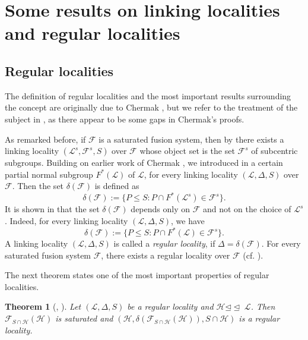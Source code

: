 \documentclass[reqno,11pt]{amsart}
\numberwithin{equation}{section}
\newtheorem{theorem}{Theorem}[section]
\theoremstyle{definition}
\newcommand{\F}{\mathcal{F}}
\renewcommand{\L}{\mathcal{L}}
\renewcommand{\H}{\mathcal{H}}
\newcommand{\subn}{{\unlhd\!\unlhd\;}}
\begin{document}
\section{Some results on linking localities and regular localities}


\subsection{Regular localities}\label{SS:Regular}

The definition of regular localities and the most important results surrounding the concept are originally due to Chermak \cite{ChermakIII}, but we refer to the treatment of the subject in \cite{Henke:Regular}, as there appear to be some gaps in Chermak's proofs.

\smallskip

As remarked before, if $\F$ is a saturated fusion system, then by \cite[Theorem~A]{Henke:2015} there exists a linking locality $(\L^s,\F^s,S)$ over $\F$ whose object set is the set $\F^s$ of subcentric subgroups. Building on earlier work of Chermak \cite{ChermakIII}, we introduced in \cite[Definition~9.17]{Henke:Regular} a certain partial normal subgroup $F^*(\L)$ of $\L$, for every linking locality $(\L,\Delta,S)$ over $\F$. Then the set $\delta(\F)$ is defined as
\begin{equation*}%
\delta(\F):=\{P\leq S\colon P\cap F^*(\L^s)\in\F^s\}.
\end{equation*}
It is shown in \cite[Lemma~10.2]{Henke:Regular} that the set $\delta(\F)$ depends only on $\F$ and not on the choice of $\L^s$. Indeed, for every linking locality $(\L,\Delta,S)$, we have
\begin{equation}\label{E:deltaF}
\delta(\F):=\{P\leq S\colon P\cap F^*(\L)\in\F^s\}.
\end{equation}
A linking locality $(\L,\Delta,S)$ is called a \emph{regular locality}, if $\Delta=\delta(\F)$. For every saturated fusion system $\F$, there exists a regular locality over $\F$ (cf. \cite[Lemma~10.4]{Henke:Regular}).

\smallskip

The next theorem states one of the most important properties of regular localities.

\begin{theorem}[{\cite[Corollary~7.9]{ChermakIII}, \cite[Corollary~10.19]{Henke:Regular}}]\label{T:RegularSubnormal}
Let $(\L,\Delta,S)$ be a regular locality and $\H\subn\L$. Then $\F_{S\cap\H}(\H)$ is saturated and $(\H,\delta(\F_{S\cap\H}(\H)),S\cap\H)$ is a regular locality.
\end{theorem}
\end{document}

